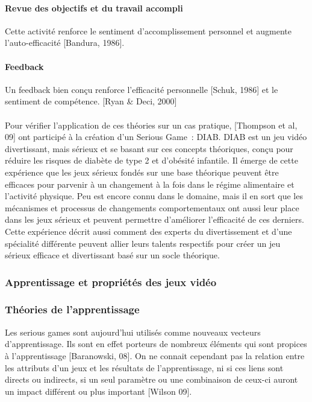 			\paragraph{Revue des objectifs et du travail accompli\\ \quad}
Cette activité renforce le sentiment d’accomplissement personnel et augmente l’auto-efficacité [Bandura, 1986].
			\paragraph{Feedback \\ \quad}
Un feedback bien conçu renforce l’efficacité personnelle [Schuk, 1986] et le sentiment de compétence. [Ryan \& Deci, 2000]
			
\paragraph{}
Pour vérifier l'application de ces théories sur un cas pratique, [Thompson et al, 09] ont participé à la création d'un Serious Game~: DIAB. DIAB est un jeu vidéo divertissant, mais sérieux et se basant sur ces concepts théoriques, conçu pour réduire les risques de diabète de type 2 et d’obésité infantile. Il émerge de cette expérience que les jeux sérieux fondés sur une base théorique peuvent être efficaces pour parvenir à un changement à la fois dans le régime alimentaire et l’activité physique. Peu est encore connu dans le domaine, mais il en sort que les mécanismes et processus de changements comportementaux ont aussi leur place dans les jeux sérieux et peuvent permettre d'améliorer l'efficacité de ces derniers. Cette expérience décrit aussi comment des experts du divertissement et d'une spécialité différente peuvent allier leurs talents respectifs pour créer un jeu sérieux efficace et divertissant basé sur un socle théorique. 
	\subsubsection{Apprentissage et propriétés des jeux vidéo}
			\subsubsection*{Théories de l'apprentissage}
Les serious games sont aujourd'hui utilisés comme nouveaux vecteurs d'apprentissage. Ils sont en effet porteurs de nombreux éléments qui sont propices à l'apprentissage [Baranowski, 08]. On ne connait cependant pas la relation entre les attributs d'un jeux et les résultats de l'apprentissage, ni si ces liens sont directs ou indirects, si un seul paramètre ou une combinaison de ceux-ci auront un impact différent ou plus important [Wilson 09]\cite{Wils09}. 

